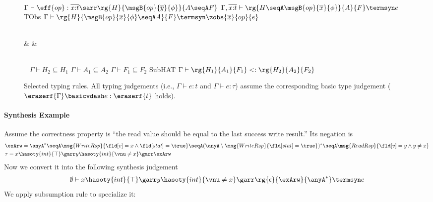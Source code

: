 \begin{figure}[!t]
{\\ \ \\ \ \\ 
\mprooftr{105mm}
{
$\Gamma \vdash \eff{op} : \overline{x{:}t}\sarr \rg{H}{\msgB{op}{\overline{y}}{\phi}}{A \seqA F}$ 
\quad
 $\Gamma, \overline{x{:}t} \vdash \rg{H \seqA \msgB{op}{\overline{x}}{\phi}}{A}{F} \termsyn e$}
{TObs}
{$\Gamma \vdash \rg{H}{\msgB{op}{\overline{x}}{\phi} \seqA A}{F} \termsyn \zobs{\overline{x}}{op}{e}$}
\\ \ 
{\small
\begin{flalign*}
 & & 
\end{flalign*}
}
\\ \
\mprooftr{80mm}
{$\Gamma \vdash H_2 \subseteq H_1$ \quad
$\Gamma \vdash A_1 \subseteq A_2$ \quad
$\Gamma \vdash F_1 \subseteq F_2$ \quad}
{SubHAT}
{$\Gamma \vdash \rg{H_1}{A_1}{F_1} <: \rg{H_2}{A_2}{F_2}$}
}
\vspace*{-.1in}
\caption{Selected typing rules. All typing judgements (i.e.,
  {\small$\Gamma \vdash e : t$} and {\small$\Gamma \vdash e : \tau$})
  assume the corresponding basic type judgement
  ({\small$\eraserf{\Gamma} \basicvdash e : \eraserf{t}$} holds).%
}
\label{fig:selected-typing-rules}
\vspace*{-.2in}
\end{figure}

\paragraph{Synthesis Example} Assume the correctness property is ``the read value should be equal to the last success write result.'' Its negation is
{\footnotesize\begin{align*}
    &\exArw \doteq \anyA^* \seqA \msg{WriteRsp}{\fld[v] = x \land \fld[stat] = \true} \seqA (\anyA \setminus \msg{WriteRsp}{\fld[stat] = \true})^* \seqA  \msg{ReadRsp}{\fld[v] = y \land y \not= x}
    \\&\tau = x\hasoty{int}{\top}\garr y\hasoty{int}{\vnu \not = x}\garr \exArw
\end{align*}}\noindent
Now we convert it into the following synthesis judgement
\begin{align*}
    \emptyset \vdash x\hasoty{int}{\top}\garr y\hasoty{int}{\vnu \not = x}\garr \rg{\epsilon}{\exArw}{\anyA^*} \termsyn e
\end{align*}\noindent
We apply subsumption rule to specialize it:


